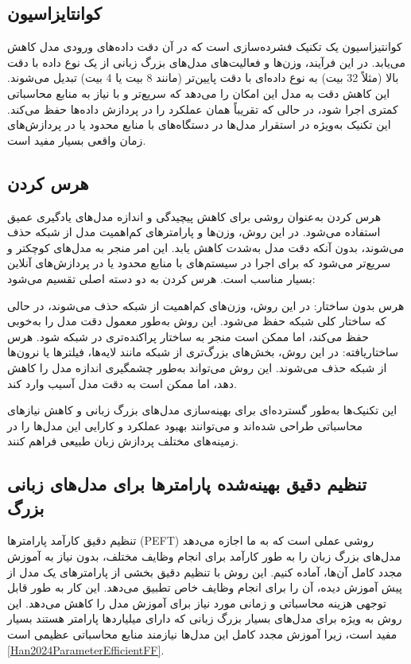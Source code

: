  \subsection{کوانتایزاسیون}
 
 کوانتیزاسیون یک تکنیک فشرده‌سازی است که در آن دقت داده‌های ورودی مدل کاهش می‌یابد. در این فرآیند، وزن‌ها و فعالیت‌های مدل‌های بزرگ زبانی از یک نوع داده با دقت بالا (مثلاً 32 بیت) به نوع داده‌ای با دقت پایین‌تر (مانند 8 بیت یا 4 بیت) تبدیل می‌شوند. این کاهش دقت به مدل این امکان را می‌دهد که سریع‌تر و با نیاز به منابع محاسباتی کمتری اجرا شود، در حالی که تقریباً همان عملکرد را در پردازش داده‌ها حفظ می‌کند. این تکنیک به‌ویژه در استقرار مدل‌ها در دستگاه‌های با منابع محدود یا در پردازش‌های زمان واقعی بسیار مفید است.
\subsection{ هرس کردن}
 
 هرس کردن به‌عنوان روشی برای کاهش پیچیدگی و اندازه مدل‌های یادگیری عمیق استفاده می‌شود. در این روش، وزن‌ها و پارامترهای کم‌اهمیت مدل از شبکه حذف می‌شوند، بدون آنکه دقت مدل به‌شدت کاهش یابد. این امر منجر به مدل‌های کوچکتر و سریع‌تر می‌شود که برای اجرا در سیستم‌های با منابع محدود یا در پردازش‌های آنلاین بسیار مناسب است. هرس کردن به دو دسته اصلی تقسیم می‌شود:
 
 هرس بدون ساختار: در این روش، وزن‌های کم‌اهمیت از شبکه حذف می‌شوند، در حالی که ساختار کلی شبکه حفظ می‌شود. این روش به‌طور معمول دقت مدل را به‌خوبی حفظ می‌کند، اما ممکن است منجر به ساختار پراکنده‌تری در شبکه شود.
 هرس ساختاریافته: در این روش، بخش‌های بزرگ‌تری از شبکه مانند لایه‌ها، فیلترها یا نرون‌ها از شبکه حذف می‌شوند. این روش می‌تواند به‌طور چشمگیری اندازه مدل را کاهش دهد، اما ممکن است به دقت مدل آسیب وارد کند.
 
 این تکنیک‌ها به‌طور گسترده‌ای برای بهینه‌سازی مدل‌های بزرگ زبانی و کاهش نیازهای محاسباتی طراحی شده‌اند و می‌توانند بهبود عملکرد و کارایی این مدل‌ها را در زمینه‌های مختلف پردازش زبان طبیعی فراهم کنند.
 
 
 
 

\subsection{ تنظیم دقیق بهینه‌شده پارامترها برای مدل‌های زبانی بزرگ}
تنظیم دقیق کارآمد پارامترها (PEFT) روشی عملی است که به ما اجازه می‌دهد مدل‌های بزرگ زبان را به طور کارآمد برای انجام وظایف مختلف، بدون نیاز به آموزش مجدد کامل آن‌ها، آماده کنیم. این روش با تنظیم دقیق بخشی از پارامترهای یک مدل از پیش آموزش دیده، آن را برای انجام وظایف خاص تطبیق می‌دهد. این کار به طور قابل توجهی هزینه محاسباتی و زمانی مورد نیاز برای آموزش مدل را کاهش می‌دهد. این روش به ویژه برای مدل‌های بسیار بزرگ زبانی که دارای میلیاردها پارامتر هستند بسیار مفید است، زیرا آموزش مجدد کامل این مدل‌ها نیازمند منابع محاسباتی عظیمی است
\ref{Han2024ParameterEfficientFF}.

